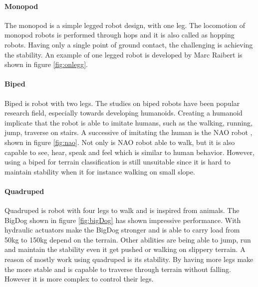\documentclass[USenglish]{ifimaster}  %
\begin{document}

\paragraph{Monopod}
The monopod is a simple legged robot design, with one leg. The locomotion of monopod robots is performed through hops and it is also called as hopping robots. Having only a single point of ground contact, the challenging is achieving the stability. An example of one legged robot is developed by Marc Raibert is shown in figure \ref{fig:onlegg}.


\paragraph{Biped}
Biped is robot with two legs. The studies on biped robots have been popular research field, especially towards developing humanoids. Creating a humanoid implicate that the robot is able to imitate humans, such as the walking, running, jump, traverse on stairs. A successive of imitating the human is the NAO robot \cite{NAO}, shown in figure \ref{fig:nao}. Not only is NAO robot able to walk, but it is also capable to see, hear, speak and feel which is similar to human behavior. However, using a biped for terrain classification is still unsuitable since it is hard to maintain stability when it for instance walking on small slope.

\paragraph{Quadruped}
Quadruped is robot with four legs to walk and is inspired from animals. The BigDog \cite{Raibert200810822} shown in figure \ref{fig:bigDog} has shown impressive performance. With hydraulic actuators make the BigDog stronger and is able to carry load from 50kg to 150kg depend on the terrain. Other abilities are being able to jump, run and maintain the stability even it get pushed or walking on slippery terrain. A reason of mostly work using quadruped is its stability. By having more legs make the more stable and is capable to traverse through terrain without falling. However it is more complex to control their legs.
\end{document}
